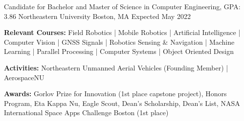 
\begin{cventries}
  \cventry
    {Candidate for Bachelor and Master of Science in Computer Engineering, GPA: 3.86} %
    {Northeastern University} %
    {Boston, MA} %
    {Expected May 2022} %
    {
      \begin{cvitems} %
         \item {\textbf{Relevant Courses:} Field Robotics | Mobile Robotics | 
         Artificial Intelligence | Computer Vision | GNSS Signals | Robotics Sensing \& Navigation |
          Machine Learning | Parallel Processing | Computer Systems | Object Oriented Design}
         \item {\textbf{Activities:} Northeastern Unmanned Aerial Vehicles (Founding Member) | AerospaceNU}
         \item {\textbf{Awards:} Gorlov Prize for Innovation (1st place capstone project), Honors Program, Eta Kappa Nu, Eagle Scout, Dean's Scholarship, 
         Dean's List, NASA International Space Apps Challenge Boston (1st place)}
      \end{cvitems}
    }
\end{cventries}
